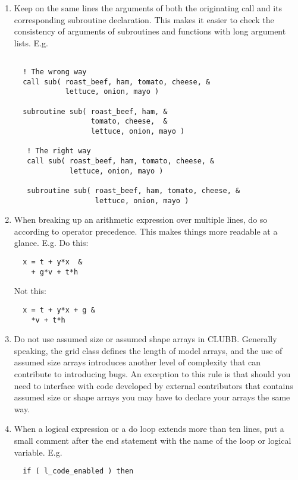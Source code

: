 \documentclass[letterpaper,12pt]{article}
\begin{document}
\begin{enumerate}
\item Keep on the same lines the arguments of both the originating call and its 
corresponding subroutine declaration.  This makes it easier to check the 
consistency of arguments of subroutines and functions with long argument lists.
\newline 
E.g.
\begin{verbatim}

  ! The wrong way
  call sub( roast_beef, ham, tomato, cheese, &
            lettuce, onion, mayo )

  subroutine sub( roast_beef, ham, &
                  tomato, cheese,  &
                  lettuce, onion, mayo )

   ! The right way
   call sub( roast_beef, ham, tomato, cheese, &
             lettuce, onion, mayo )

   subroutine sub( roast_beef, ham, tomato, cheese, &
                   lettuce, onion, mayo )

\end{verbatim}

\item When breaking up an arithmetic expression over multiple lines, do so according to 
operator precedence.  This makes things more readable at a glance. \newline
E.g. Do this: 
\begin{verbatim}
  x = t + y*x  &
    + g*v + t*h
\end{verbatim}

Not this:
\begin{verbatim}
  x = t + y*x + g &
    *v + t*h
\end{verbatim}

\item Do not use assumed size or assumed shape arrays in CLUBB.  
Generally speaking, the grid class defines the length of model arrays, 
and the use of assumed size arrays introduces another level of complexity 
that can contribute to introducing bugs.  An exception to this rule is
that should you need to interface with code developed by external contributors 
that contains assumed size or shape arrays you may have to declare your arrays
the same way.
\newline

\item When a logical expression or a do loop extends more than ten lines, put a
small comment after the end statement with the name of the loop or logical
variable.
E.g. \newline
\begin{verbatim}
  if ( l_code_enabled ) then


\end{verbatim}
\end{enumerate}
\end{document}
